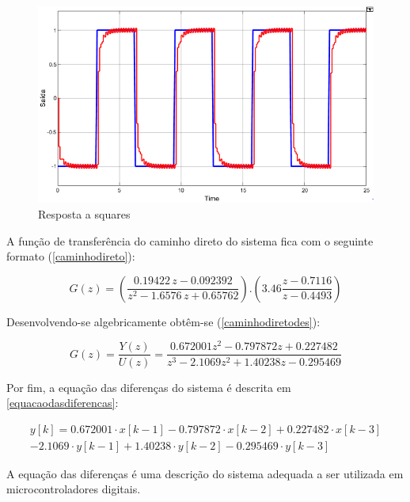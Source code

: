 \documentclass[a4paper,11pt]{article}
\begin{document}
\begin{figure}[H]
    \centering
    \includegraphics[width=\linewidth]{src/tex/img/teste_square.PNG}
    \caption{Resposta a squares}
    \label{fig:lgr}
\end{figure}

A função de transferência do caminho direto do sistema fica com o seguinte formato (\ref{caminhodireto}):

\begin{equation}
G(z)=(\frac{0.19422\,z-0.092392}{z^2-1.6576\,z+0.65762}) . (3.46\frac{z - 0.7116}{z - 0.4493})
\label{caminhodireto}
\end{equation}

Desenvolvendo-se algebricamente obtêm-se (\ref{caminhodiretodes}):

\begin{equation}
G(z)= \frac{Y(z)}{U(z)} = \frac{0.672001 z^{2}-0.797872 z+0.227482}{z^{3}-2.1069 z^{2}+1.40238 z-0.295469}
\label{caminhodiretodes}
\end{equation}

Por fim, a equação das diferenças do sistema é descrita em \ref{equacaodasdiferencas}:

\begin{equation}
\begin{split}
y[k]=0.672001 \cdot x[k-1]-0.797872 \cdot x[k-2]+0.227482 \cdot x[k-3] \\-2.1069 \cdot y[k-1]+1.40238 \cdot y[k-2]-0.295469 \cdot y[k-3]
\end{split}
\label{equacaodasdiferencas}
\end{equation}

A equação das diferenças é uma descrição do sistema adequada a ser utilizada em microcontroladores digitais.


\end{document}
